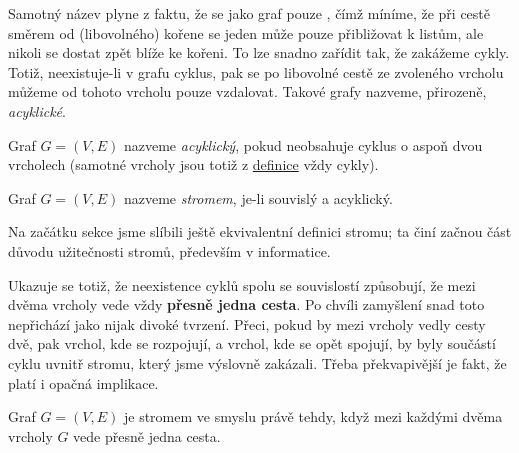 Samotný název  plyne z faktu, že se jako graf pouze , čímž
míníme, že při cestě směrem od (libovolného) kořene se jeden může pouze
přibližovat k listům, ale nikoli se dostat zpět blíže ke kořeni. To lze snadno
zařídit tak, že zakážeme cykly. Totiž, neexistuje-li v grafu cyklus, pak se po
libovolné cestě ze zvoleného vrcholu můžeme od tohoto vrcholu pouze vzdalovat.
Takové grafy nazveme, přirozeně, \emph{acyklické}.

\begin{definition}
\label{def:acyklicky-graf}
 Graf $G = (V,E)$ nazveme \emph{acyklický}, pokud neobsahuje cyklus o aspoň dvou
 vrcholech (samotné vrcholy jsou totiž z \hyperref[def:cyklus]{definice} vždy
 cykly).
\end{definition}

\begin{definition}[Strom]
\label{def:strom}
 Graf $G = (V,E)$ nazveme \emph{stromem}, je-li souvislý a acyklický.
\end{definition}

Na začátku sekce jsme slíbili ještě ekvivalentní definici stromu; ta činí začnou
část důvodu užitečnosti stromů, především v informatice.

Ukazuje se totiž, že neexistence cyklů spolu se souvislostí způsobují, že mezi
dvěma vrcholy vede vždy \textbf{přesně jedna cesta}. Po chvíli zamyšlení snad
toto nepřichází jako nijak divoké tvrzení. Přeci, pokud by mezi vrcholy vedly
cesty dvě, pak vrchol, kde se rozpojují, a vrchol, kde se opět spojují, by byly
součástí cyklu uvnitř stromu, který jsme výslovně zakázali. Třeba překvapivější
je fakt, že platí i opačná implikace.

\begin{claim}
 \label{claim:ekvivalentni-definice-stromu}
 Graf $G = (V,E)$ je stromem ve smyslu  právě tehdy,
 když mezi každými dvěma vrcholy $G$ vede přesně jedna cesta.
\end{claim}


